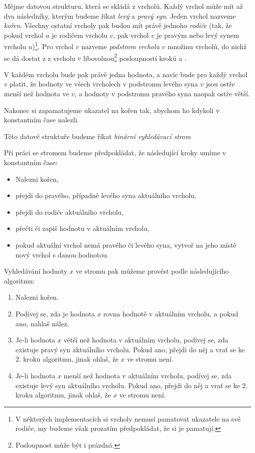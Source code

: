 \begin{definice}
Mějme datovou strukturu, která se skládá z vrcholů. Každý vrchol může mít až
dva následníky, kterým budeme říkat \emph{levý} a \emph{pravý syn}. Jeden
vrchol nazveme \emph{kořen}. Všechny ostatní vrcholy pak budou mít právě
jednoho \emph{rodiče} (tak, že pokud vrchol $u$ je rodičem vrcholu $v$, pak
vrchol $v$ je pravým nebo levý synem vrcholu $u$)\footnote{V některých
implementacích si vrcholy nemusí pamatovat ukazatele na své rodiče, my budeme
však prozatím předpokládat, že si je pamatují.}. Pro vrchol $v$ nazveme
\emph{podstrom vrcholu $v$} množinu vrcholů, do nichž se dá dostat z z vrcholu
$v$ libovolnou\footnote{Posloupnost může být i prázdná.} posloupností kroků 
 a .

V každém vrcholu bude pak právě jedna hodnota, a navíc bude pro každý vrchol $v$ platit, že hodnoty ve všech vrcholech v podstromu levého syna $v$ jsou ostře menší než hodnota ve $v$, a hodnoty v podstromu pravého syna naopak ostře větší.

Nakonec si zapamatujeme ukazatel na kořen tak, abychom ho kdykoli v konstantním čase nalezli.

Této datové struktuře budeme říkat \emph{binární vyhledávací strom}
\end{definice}

Při práci se stromem budeme předpokládat, že následující kroky umíme v konstantním čase:
\begin{itemize}
\item Nalezni kořen,
\item přejdi do pravého, případně levého syna aktuálního vrcholu,
\item přejdi do rodiče aktuálního vrcholu,
\item přečti či zapiš hodnotu v aktuálním vrcholu,
\item pokud aktuální vrchol nemá pravého či levého syna, vytvoř na jeho místě nový vrchol s danou hodnotou.
\end{itemize}
Vyhledávání hodnoty $x$ ve stromu pak můžeme provést podle následujícího algoritmu:
\begin{enumerate}
\item Nalezni kořen.
\item Podívej se, zda je hodnota $x$ rovna hodnotě v aktuálním vrcholu, a pokud ano, nahlaš nález.
\item Je-li hodnota $x$ větší než hodnota v aktuálním vrcholu, podívej se, zda existuje pravý syn aktuálního vrcholu. Pokud ano, přejdi do něj a vrať se ke 2. kroku algoritmu, jinak ohlaš, že  $x$ ve stromu není.
\item Je-li hodnota $x$ menší než hodnota v aktuálním vrcholu, podívej se, zda existuje levý syn aktuálního vrcholu. Pokud ano, přejdi do něj a vrať se ke 2. kroku algoritmu, jinak ohlaš, že  $x$ ve stromu není.
\end{enumerate}

